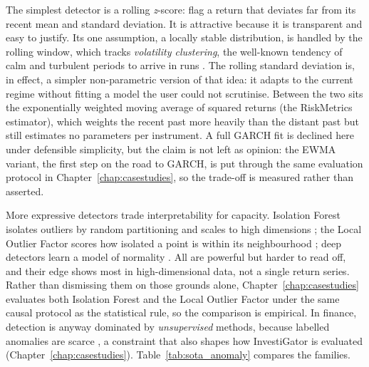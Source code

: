 The simplest detector is a rolling \emph{z}-score: flag a return that deviates far from its recent mean and
standard deviation. It is attractive because it is transparent and easy to justify. Its one assumption, a
locally stable distribution, is handled by the rolling window, which tracks \emph{volatility clustering},
the well-known tendency of calm and turbulent periods to arrive in runs
\autocite{engle1982arch, bollerslev1986garch}. The rolling standard deviation is, in effect, a simpler
non-parametric version of that idea: it adapts to the current regime without fitting a model the user
could not scrutinise. Between the two sits the exponentially weighted moving average of squared returns
(the RiskMetrics estimator), which weights the recent past more heavily than the distant past but still
estimates no parameters per instrument. A full GARCH fit is declined here under defensible simplicity,
but the claim is not left as opinion: the EWMA variant, the first step on the road to GARCH, is put
through the same evaluation protocol in Chapter~\ref{chap:casestudies}, so the trade-off is measured
rather than asserted.

More expressive detectors trade interpretability for capacity. Isolation Forest isolates outliers by
random partitioning and scales to high dimensions \autocite{liu2008isolation}; the Local Outlier Factor
scores how isolated a point is within its neighbourhood \autocite{breunig2000lof}; deep detectors learn a
model of normality \autocite{pang2021deep}. All are powerful but harder to read off, and their edge shows
most in high-dimensional data, not a single return series. Rather than dismissing them on those grounds
alone, Chapter~\ref{chap:casestudies} evaluates both Isolation Forest and the Local Outlier Factor under
the same causal protocol as the statistical rule, so the comparison is empirical. In finance, detection
is anyway dominated by \emph{unsupervised} methods, because labelled anomalies are scarce
\autocite{ahmed2016financial}, a constraint that also shapes how InvestiGator is evaluated
(Chapter~\ref{chap:casestudies}). Table~\ref{tab:sota_anomaly} compares the families.

